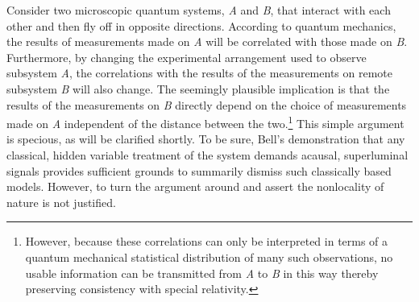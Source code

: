 \documentclass[12pt]{article}
\begin{document}
Consider two microscopic quantum systems, {\it A} and {\it B}, that interact with each other and then fly off in opposite directions. According to quantum mechanics, the results of measurements made on {\it A} will be correlated with those made on {\it B}. Furthermore, by changing the experimental arrangement used to observe subsystem {\it A}, the correlations with the results of the measurements on remote subsystem {\it B} will also change. The seemingly plausible implication is that the results of the measurements on {\it B} directly depend on the choice of measurements made on {\it A} independent of the distance between the two.\footnote{However, because these correlations can only be interpreted in terms of a quantum mechanical statistical distribution of many such observations, no usable information can be transmitted from {\it A} to {\it B} in this way thereby preserving consistency with special relativity.} This simple argument is specious, as will be clarified shortly. To be sure, Bell's demonstration that any classical, hidden variable treatment of the system demands acausal, superluminal signals provides sufficient grounds to summarily dismiss such classically based models. However, to turn the argument around and assert the nonlocality of nature is not justified. 
\end{document}
